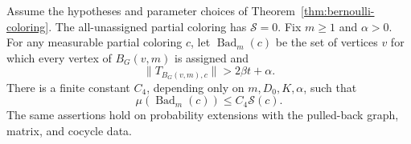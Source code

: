 \begin{lemma}
\label{lem:bad-balls}
Assume the hypotheses and parameter choices of
Theorem~\ref{thm:bernoulli-coloring}.  The all-unassigned partial coloring
has $\mathcal S=0$.  Fix $m\geq1$ and $\alpha>0$.  For any measurable
partial coloring $c$, let $\operatorname{Bad}_m(c)$ be the set of vertices
$v$ for which every vertex of $B_G(v,m)$ is assigned and
\[
 \|T_{B_G(v,m),c}\|>2\beta t+\alpha.
\]
There is a finite constant $C_4$, depending only on $m,D_0,K,\alpha$, such
that
\begin{equation}
 \mu(\operatorname{Bad}_m(c))\leq C_4\mathcal S(c).
 \label{eq:coloring-bad-balls}
\end{equation}
The same assertions hold on probability extensions with the pulled-back
graph, matrix, and cocycle data.
\end{lemma}

